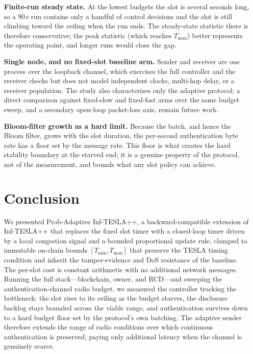 \documentclass[conference]{IEEEtran}
\begin{document}
\textbf{Finite-run steady state.} At the lowest budgets the slot is several
seconds long, so a $90$\,s run contains only a handful of control decisions and
the slot is still climbing toward the ceiling when the run ends. The steady-state
statistic there is therefore conservative; the peak statistic (which reaches
$T_{\max}$) better represents the operating point, and longer runs would close the
gap.

\textbf{Single node, and no fixed-slot baseline arm.} Sender and receiver are one
process over the loopback channel, which exercises the full controller and the
receiver checks but does not model independent clocks, multi-hop delay, or a
receiver population. The study also characterizes only the adaptive protocol; a
direct comparison against fixed-slow and fixed-fast arms over the same budget
sweep, and a secondary open-loop packet-loss axis, remain future work.

\textbf{Bloom-filter growth as a hard limit.} Because the batch, and hence the
Bloom filter, grows with the slot duration, the per-second authentication byte
rate has a floor set by the message rate. This floor is what creates the hard
stability boundary at the starved end; it is a genuine property of the protocol,
not of the measurement, and bounds what any slot policy can achieve.

\section{Conclusion}
We presented Prob-Adaptive Inf-TESLA++, a backward-compatible extension of
Inf-TESLA++ that replaces the fixed slot timer with a closed-loop timer driven by
a local congestion signal and a bounded proportional update rule, clamped to
immutable on-chain bounds $[T_{\min},T_{\max}]$ that preserve the TESLA timing
condition and inherit the tamper-evidence and DoS resistance of the baseline. The
per-slot cost is constant arithmetic with no additional network messages. Running
the full stack---blockchain, owner, and RCD---and sweeping the
authentication-channel radio budget, we measured the controller tracking the
bottleneck: the slot rises to its ceiling as the budget starves, the disclosure
backlog stays bounded across the viable range, and authentication survives down to
a hard budget floor set by the protocol's own batching. The adaptive sender
therefore extends the range of radio conditions over which continuous
authentication is preserved, paying only additional latency when the channel is
genuinely scarce.
\end{document}
